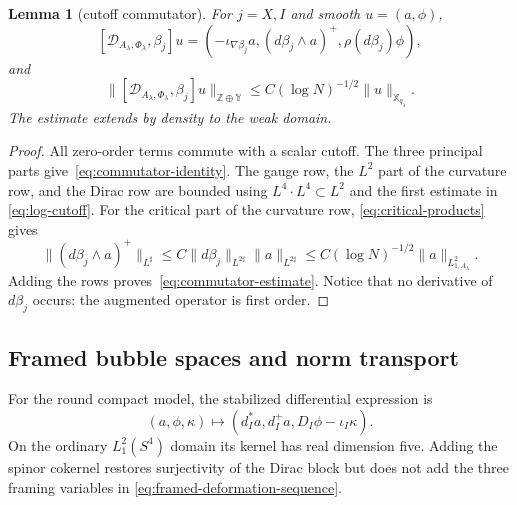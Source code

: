\documentclass[11pt]{amsart}
\newtheorem{lemma}[theorem]{Lemma}
\theoremstyle{definition}
\theoremstyle{remark}
\theoremstyle{plain}
\begin{document}
\begin{lemma}[cutoff commutator]\label{lem:commutator}
For $j=X,I$ and smooth $u=(a,\phi)$,
\begin{equation}\label{eq:commutator-identity}
 [\mathscr D_{A_\lambda,\Phi_\lambda},\beta_j]u
 =\left(-\iota_{\nabla\beta_j}a,
 (d\beta_j\wedge a)^+,\rho(d\beta_j)\phi\right),
\end{equation}
and
\begin{equation}\label{eq:commutator-estimate}
 \|[\mathscr D_{A_\lambda,\Phi_\lambda},\beta_j]u\|_{
 \mathbb Z\oplus\mathbb Y}
 \leq C(\log N)^{-1/2}\|u\|_{\mathbb X_{q_\lambda}}.
\end{equation}
The estimate extends by density to the weak domain.
\end{lemma}

\begin{proof}
All zero-order terms commute with a scalar cutoff.  The three principal
parts give~\eqref{eq:commutator-identity}.  The gauge row, the $L^2$ part of
the curvature row, and the Dirac row are bounded using
$L^4\cdot L^4\subset L^2$ and the first estimate in
\eqref{eq:log-cutoff}.  For the critical part of the curvature row,
\eqref{eq:critical-products} gives
\[
 \|(d\beta_j\wedge a)^+\|_{L^\sharp}
 \leq C\|d\beta_j\|_{L^{2\sharp}}
       \|a\|_{L^{2\sharp}}
 \leq C(\log N)^{-1/2}\|a\|_{L^2_{1,A_\lambda}}.
\]
Adding the rows proves~\eqref{eq:commutator-estimate}.  Notice that no
derivative of $d\beta_j$ occurs: the augmented operator is first order.
\end{proof}

\subsection{Framed bubble spaces and norm transport}
For the round compact model, the stabilized differential expression is
\begin{equation}\label{eq:round-bubble-operator}
 (a,\phi,\kappa)\longmapsto
 (d_I^*a,d_I^+a,D_I\phi-\iota_I\kappa).
\end{equation}
On the ordinary $L^2_1(S^4)$ domain its kernel has real dimension five.
Adding the spinor cokernel restores surjectivity of the Dirac block but
does not add the three framing variables in
\eqref{eq:framed-deformation-sequence}.
\end{document}
